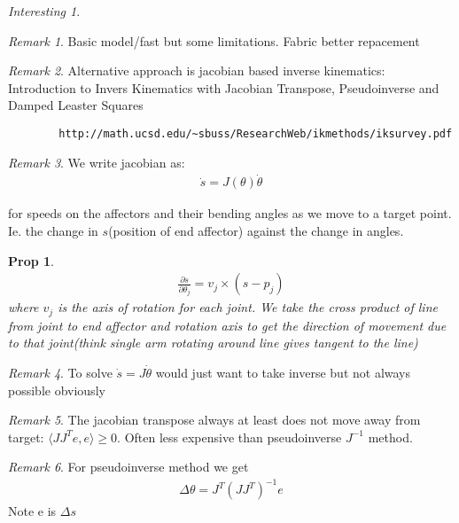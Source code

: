 \documentclass[11pt]{article}
\newtheorem{prop}{Prop}
\theoremstyle{remark}
\newtheorem{remark}{Remark}
\newtheorem{interest}{Interesting}
\begin{document}
\begin{interest}
\begin{remark}
	Basic model/fast but some limitations. Fabric better repacement
\end{remark}


\begin{remark}
	Alternative approach is jacobian based inverse kinematics: Introduction to Invers Kinematics with Jacobian Transpose, Pseudoinverse and Damped Leaster Squares
	\begin{verbatim}
		http://math.ucsd.edu/~sbuss/ResearchWeb/ikmethods/iksurvey.pdf
	\end{verbatim}
\end{remark}

\begin{remark}
	We write jacobian as:
	\begin{align*}
		\dot{s} = J(\theta)\dot{\theta}
	\end{align*}

	for speeds on the affectors and their bending angles as we move to a target point. Ie. the change in $s$(position of end affector) against the change in angles.
\end{remark}

\begin{prop}
	\begin{align*}
		\frac{\partial s}{\partial \theta_j} = v_j \times (s - p_j)
	\end{align*}
	where $v_j$ is the axis of rotation for each joint. We take the cross product of line from joint to end affector and rotation axis to get the direction of movement due to that joint(think single arm rotating around line gives tangent to the line)
\end{prop}

\begin{remark}
	To solve $\dot{s} = J\dot{\theta}$ would just want to take inverse but not always possible obviously
\end{remark}

\begin{remark}
	The jacobian transpose always at least does not move away from target: $\langle  J J^T e, e \rangle \geq0$. Often less expensive than pseudoinverse $J^{-1}$ method. 
\end{remark}

\begin{remark}
	For pseudoinverse method we get
	\begin{align*}
		\Delta\theta = J^T(JJ^T)^{-1}e
	\end{align*}
	Note e is $\Delta s$
\end{remark}


\end{interest}
\end{document}
